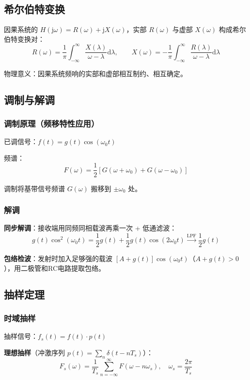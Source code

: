 \documentclass[11pt,a4paper]{ctexart}
\newcommand{\jj}{\mathrm{j}}            %
\newcommand{\dd}{\mathrm{d}}            %
\newcommand{\dirac}{\delta}             %
\begin{document}
\subsection{希尔伯特变换}

因果系统的 $H(\jj\omega) = R(\omega) + \jj X(\omega)$，实部 $R(\omega)$ 与虚部 $X(\omega)$ 构成希尔伯特变换对：
\[
R(\omega) = \frac{1}{\pi}\int_{-\infty}^{\infty} \frac{X(\lambda)}{\omega - \lambda}\dd\lambda,\qquad
X(\omega) = -\frac{1}{\pi}\int_{-\infty}^{\infty} \frac{R(\lambda)}{\omega - \lambda}\dd\lambda
\]

物理意义：因果系统频响的实部和虚部相互制约、相互确定。

\subsection{调制与解调}

\subsubsection{调制原理（频移特性应用）}
已调信号：$f(t) = g(t)\cos(\omega_0 t)$

频谱：
\[
F(\omega) = \frac{1}{2}[G(\omega + \omega_0) + G(\omega - \omega_0)]
\]

调制将基带信号频谱 $G(\omega)$ 搬移到 $\pm\omega_0$ 处。

\subsubsection{解调}
\textbf{同步解调}：接收端用同频同相载波再乘一次 + 低通滤波：
\[
g(t)\cos^2(\omega_0 t) = \frac{1}{2}g(t) + \frac{1}{2}g(t)\cos(2\omega_0 t) \xrightarrow{\text{LPF}} \frac{1}{2}g(t)
\]

\textbf{包络检波}：发射时加入足够强的载波 $[A + g(t)]\cos(\omega_0 t)$（$A + g(t) > 0$），用二极管和RC电路提取包络。

\subsection{抽样定理}

\subsubsection{时域抽样}
抽样信号：$f_s(t) = f(t) \cdot p(t)$

\textbf{理想抽样}（冲激序列 $p(t) = \sum_n \dirac(t - nT_s)$）：
\[
F_s(\omega) = \frac{1}{T_s}\sum_{n=-\infty}^{\infty} F(\omega - n\omega_s),\quad \omega_s = \frac{2\pi}{T_s}
\]
\end{document}
